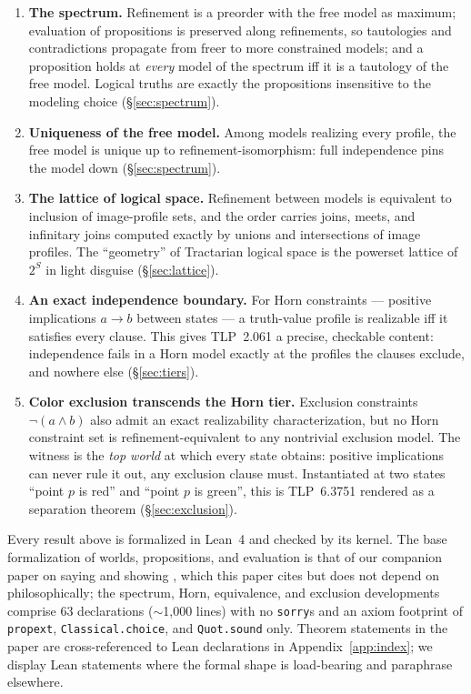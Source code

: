 \documentclass[10pt, letterpaper]{article}
\theoremstyle{remark}
\newcommand{\lean}[1]{\texttt{#1}}
\newcommand{\TLP}[1]{TLP~#1}
\begin{document}
\begin{enumerate}[label=(C\arabic*), leftmargin=3em]
\item\label{c:spectrum} \textbf{The spectrum.} Refinement is a preorder with
  the free model as maximum; evaluation of propositions is preserved along
  refinements, so tautologies and contradictions propagate from freer to more
  constrained models; and a proposition holds at \emph{every} model of the
  spectrum iff it is a tautology of the free model. Logical truths are
  exactly the propositions insensitive to the modeling choice
  (\S\ref{sec:spectrum}).
\item\label{c:unique} \textbf{Uniqueness of the free model.} Among models
  realizing every profile, the free model is unique up to
  refinement-isomorphism: full independence pins the model down
  (\S\ref{sec:spectrum}).
\item\label{c:lattice} \textbf{The lattice of logical space.} Refinement
  between models is equivalent to inclusion of image-profile sets, and the
  order carries joins, meets, and infinitary joins computed exactly by unions
  and intersections of image profiles. The ``geometry'' of Tractarian logical
  space is the powerset lattice of $2^S$ in light disguise
  (\S\ref{sec:lattice}).
\item\label{c:horn} \textbf{An exact independence boundary.} For Horn
  constraints --- positive implications $a \to b$ between states --- a
  truth-value profile is realizable iff it satisfies every clause. This gives
  \TLP{2.061} a precise, checkable content: independence fails in a Horn model
  exactly at the profiles the clauses exclude, and nowhere else
  (\S\ref{sec:tiers}).
\item\label{c:exclusion} \textbf{Color exclusion transcends the Horn tier.}
  Exclusion constraints $\neg(a \wedge b)$ also admit an exact realizability
  characterization, but no Horn constraint set is refinement-equivalent to
  any nontrivial exclusion model. The witness is the \emph{top world} at
  which every state obtains: positive implications can never rule it out,
  any exclusion clause must. Instantiated at two states ``point $p$ is red''
  and ``point $p$ is green'', this is \TLP{6.3751} rendered as a separation
  theorem (\S\ref{sec:exclusion}).
\end{enumerate}

Every result above is formalized in Lean~4 \cite{moura2021} and checked by
its kernel. The base formalization of worlds, propositions, and evaluation is
that of our companion paper on saying and showing \cite{companion2026}, which
this paper cites but does not depend on philosophically; the spectrum, Horn,
equivalence, and exclusion developments comprise 63 declarations
($\sim$1{,}000 lines) with no \lean{sorry}s and an axiom footprint of
\lean{propext}, \lean{Classical.choice}, and \lean{Quot.sound} only. Theorem
statements in the paper are cross-referenced to Lean declarations in
Appendix~\ref{app:index}; we display Lean statements where the formal shape
is load-bearing and paraphrase elsewhere.
\end{document}
